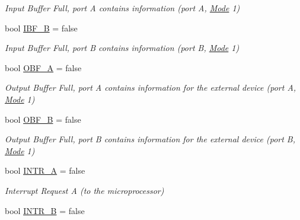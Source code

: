 \begin{DoxyCompactItemize}
\begin{DoxyCompactList}\small\item\em Input Buffer Full, port A contains information (port A, \hyperlink{structMode}{Mode} 1) \end{DoxyCompactList}\item 
\hypertarget{classIntel8255_a5576bb32d1d14c809954c95b1e140b00}{bool \hyperlink{classIntel8255_a5576bb32d1d14c809954c95b1e140b00}{I\-B\-F\-\_\-\-B} = false}\label{classIntel8255_a5576bb32d1d14c809954c95b1e140b00}

\begin{DoxyCompactList}\small\item\em Input Buffer Full, port B contains information (port B, \hyperlink{structMode}{Mode} 1) \end{DoxyCompactList}\item 
\hypertarget{classIntel8255_ad6207273407dcfb3ed9785613838baf7}{bool \hyperlink{classIntel8255_ad6207273407dcfb3ed9785613838baf7}{O\-B\-F\-\_\-\-A} = false}\label{classIntel8255_ad6207273407dcfb3ed9785613838baf7}

\begin{DoxyCompactList}\small\item\em Output Buffer Full, port A contains information for the external device (port A, \hyperlink{structMode}{Mode} 1) \end{DoxyCompactList}\item 
\hypertarget{classIntel8255_a5d84e8f433d4aeaf15d5f79cbadd878e}{bool \hyperlink{classIntel8255_a5d84e8f433d4aeaf15d5f79cbadd878e}{O\-B\-F\-\_\-\-B} = false}\label{classIntel8255_a5d84e8f433d4aeaf15d5f79cbadd878e}

\begin{DoxyCompactList}\small\item\em Output Buffer Full, port B contains information for the external device (port B, \hyperlink{structMode}{Mode} 1) \end{DoxyCompactList}\item 
\hypertarget{classIntel8255_a1b037b991428a40a2c4437723fc26b63}{bool \hyperlink{classIntel8255_a1b037b991428a40a2c4437723fc26b63}{I\-N\-T\-R\-\_\-\-A} = false}\label{classIntel8255_a1b037b991428a40a2c4437723fc26b63}

\begin{DoxyCompactList}\small\item\em Interrupt Request A (to the microprocessor) \end{DoxyCompactList}\item 
\hypertarget{classIntel8255_af60b776612a4b393fb3ceb0fcb273750}{bool \hyperlink{classIntel8255_af60b776612a4b393fb3ceb0fcb273750}{I\-N\-T\-R\-\_\-\-B} = false}\label{classIntel8255_af60b776612a4b393fb3ceb0fcb273750}


\end{DoxyCompactItemize}
